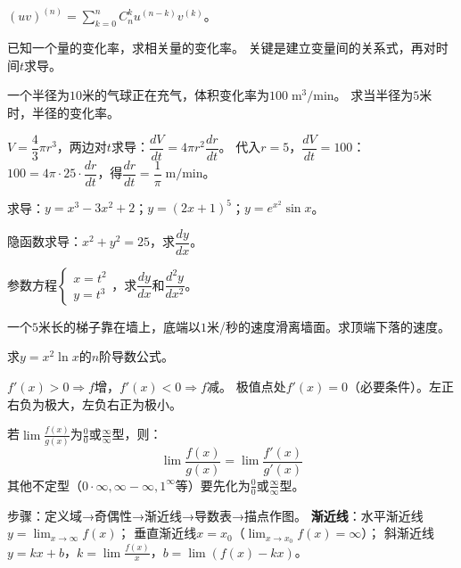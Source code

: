 \documentclass[a4paper,12pt]{ctexart}
\begin{document}

$(uv)^{(n)} = \sum_{k=0}^n C_n^k u^{(n-k)}v^{(k)}$。


已知一个量的变化率，求相关量的变化率。
关键是建立变量间的关系式，再对时间$t$求导。

\begin{example}
一个半径为$10$米的气球正在充气，体积变化率为$100\;\text{m}^3/\text{min}$。
求当半径为$5$米时，半径的变化率。
\end{example}
\begin{solution}
$V=\dfrac43\pi r^3$，两边对$t$求导：$\dfrac{dV}{dt}=4\pi r^2\dfrac{dr}{dt}$。
代入$r=5$，$\dfrac{dV}{dt}=100$：
$100=4\pi\cdot25\cdot\dfrac{dr}{dt}$，得$\dfrac{dr}{dt}=\dfrac1\pi\;\text{m/min}$。
\end{solution}


\begin{exercise}
\item 求导：$y=x^3-3x^2+2$；$y=(2x+1)^5$；$y=e^{x^2}\sin x$。
\item 隐函数求导：$x^2+y^2=25$，求$\dfrac{dy}{dx}$。
\item 参数方程$\begin{cases}x=t^2\\y=t^3\end{cases}$，求$\dfrac{dy}{dx}$和$\dfrac{d^2y}{dx^2}$。
\item 一个$5$米长的梯子靠在墙上，底端以$1$米/秒的速度滑离墙面。求顶端下落的速度。
\item 求$y=x^2\ln x$的$n$阶导数公式。
\end{exercise}

\newpage



$f'(x)>0\Rightarrow f$增，$f'(x)<0\Rightarrow f$减。
极值点处$f'(x)=0$（必要条件）。左正右负为极大，左负右正为极小。


若$\lim\frac{f(x)}{g(x)}$为$\frac00$或$\frac\infty\infty$型，则：
\[
\lim\frac{f(x)}{g(x)} = \lim\frac{f'(x)}{g'(x)}
\]
其他不定型（$0\cdot\infty,\infty-\infty,1^\infty$等）要先化为$\frac00$或$\frac\infty\infty$型。


步骤：定义域→奇偶性→渐近线→导数表→描点作图。
\textbf{渐近线}：水平渐近线$y=\lim_{x\to\infty}f(x)$；
垂直渐近线$x=x_0$（$\lim_{x\to x_0}f(x)=\infty$）；
斜渐近线$y=kx+b$，$k=\lim\frac{f(x)}{x}$，$b=\lim(f(x)-kx)$。
\end{document}
